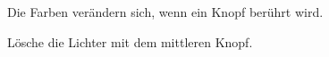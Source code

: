 \begin{figure}[htb]
\begin{center}
\caption{Die Farben verändern sich, wenn ein Knopf berührt wird.}\label{fig.colors}
\end{center}
\end{figure}

\begin{figure}[htb]
\begin{center}
\caption{Lösche die Lichter mit dem mittleren Knopf.}\label{fig.colors-off}
\end{center}
\end{figure}
